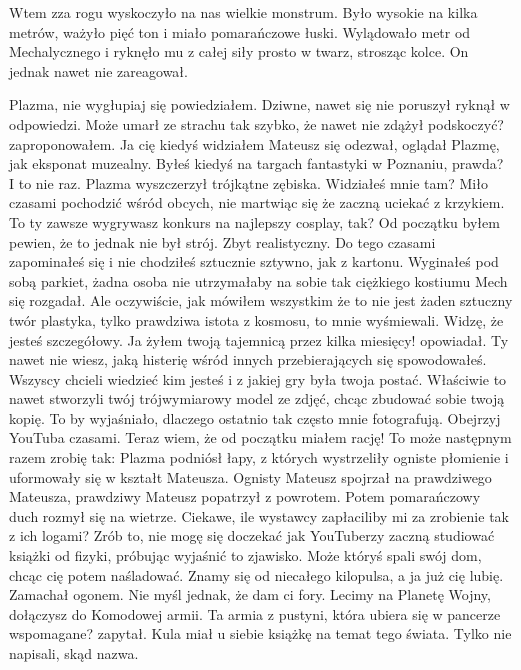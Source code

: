Wtem zza rogu wyskoczyło na nas wielkie monstrum.
Było wysokie na kilka metrów, ważyło pięć ton i miało pomarańczowe łuski.
Wylądowało metr od Mechalycznego i ryknęło mu z całej siły prosto w twarz, strosząc kolce.
On jednak nawet nie zareagował.
\begin{dialogue}
\ds{} Plazma, nie wygłupiaj się \dm{} powiedziałem.
\ds{} Dziwne, nawet się nie poruszył \dm{} ryknął w odpowiedzi.
\ds{} Może umarł ze strachu tak szybko, że nawet nie zdążył podskoczyć? \dm{} zaproponowałem.
\ds{} Ja cię kiedyś widziałem \dm{} Mateusz się odezwał, oglądał Plazmę, jak eksponat muzealny. \dm{} Byłeś kiedyś na targach fantastyki w Poznaniu, prawda?
\ds{} I to nie raz. \dm{} Plazma wyszczerzył trójkątne zębiska. \dm{} Widziałeś mnie tam? Miło czasami pochodzić wśród obcych, nie martwiąc się że zaczną uciekać z krzykiem.
\ds{} To ty zawsze wygrywasz konkurs na najlepszy cosplay, tak? Od początku byłem pewien, że to jednak nie był strój. Zbyt realistyczny.
Do tego czasami zapominałeś się i nie chodziłeś sztucznie sztywno, jak z kartonu. 
Wyginałeś pod sobą parkiet, żadna osoba nie utrzymałaby na sobie tak ciężkiego kostiumu \dm{} Mech się rozgadał. \dm{} 
Ale oczywiście, jak mówiłem wszystkim że to nie jest żaden sztuczny twór plastyka, tylko prawdziwa istota z kosmosu, to mnie wyśmiewali. 
\ds{} Widzę, że jesteś szczegółowy.
\ds{} Ja żyłem twoją tajemnicą przez kilka miesięcy! \dm{} opowiadał. \dm{} Ty nawet nie wiesz, jaką histerię wśród innych przebierających się spowodowałeś. 
Wszyscy chcieli wiedzieć kim jesteś i z jakiej gry była twoja postać. 
Właściwie to nawet stworzyli twój trójwymiarowy model ze zdjęć, chcąc zbudować sobie twoją kopię.
\ds{} To by wyjaśniało, dlaczego ostatnio tak często mnie fotografują.
\ds{} Obejrzyj YouTuba czasami. Teraz wiem, że od początku miałem rację!
\ds{} To może następnym razem zrobię tak: \dm{} Plazma podniósł łapy, z których wystrzeliły ogniste płomienie i uformowały się w kształt Mateusza. 
Ognisty Mateusz spojrzał na prawdziwego Mateusza, prawdziwy Mateusz popatrzył z powrotem. Potem pomarańczowy duch rozmył się na wietrze. \dm{} 
Ciekawe, ile wystawcy zapłaciliby mi za zrobienie tak z ich logami?
\ds{} Zrób to, nie mogę się doczekać jak YouTuberzy zaczną studiować książki od fizyki, próbując wyjaśnić to zjawisko. Może któryś spali swój dom, chcąc cię potem naśladować.
\ds{} Znamy się od niecałego kilopulsa, a ja już cię lubię. \dm{} Zamachał ogonem. \dm{} Nie myśl jednak, że dam ci fory. Lecimy na Planetę Wojny, dołączysz do Komodowej armii.
\ds{} Ta armia z pustyni, która ubiera się w pancerze wspomagane? \dm{} zapytał. \dm{} Kula miał u siebie książkę na temat tego świata. Tylko nie napisali, skąd nazwa.

\end{dialogue}
